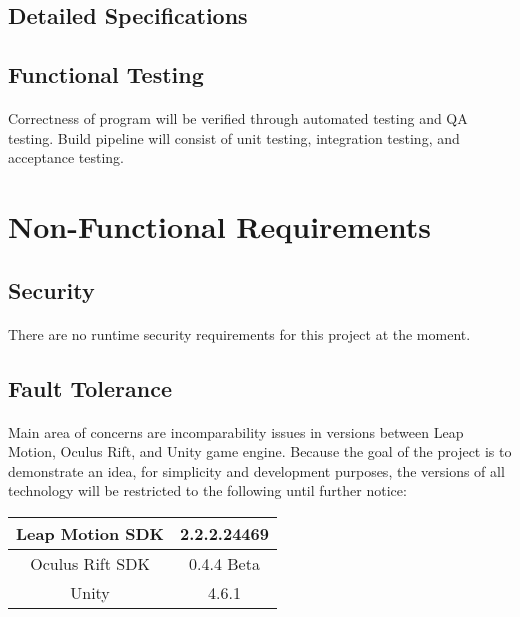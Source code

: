 \subsection{Detailed Specifications}

\subsection{Functional Testing}

\paragraph{} Correctness of program will be verified through automated testing and QA testing. Build pipeline will consist of unit testing, integration testing, and acceptance testing.

\section{Non-Functional Requirements}

\subsection{Security}

\paragraph{} There are no runtime security requirements for this project at the moment.

\subsection{Fault Tolerance}

\paragraph{} Main area of concerns are incomparability issues in versions between Leap Motion, Oculus Rift, and Unity game engine. Because the goal of the project is to demonstrate an idea, for simplicity and development purposes, the versions of all technology will be restricted to the following until further notice:

\begin{table}[H]
	\renewcommand*{\arraystretch}{1.5}
	\centering
	\begin{tabular}{| c | c |}
		\hline
		Leap Motion SDK		&	2.2.2.24469\\
		\hline
		Oculus Rift SDK		&	0.4.4 Beta\\
		\hline
		Unity				&	4.6.1\\
		\hline
	\end{tabular}
\end{table}

